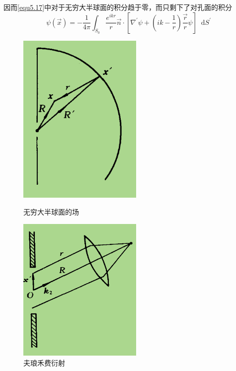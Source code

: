 \documentclass[UTF8]{ctexart}
\newcommand*{\dif}{\mathop{}\!\mathrm{d}}
\begin{document}
\noindent 因而\autoref{equ5.17}中对于无穷大半球面的积分趋于零，而只剩下了对孔面的积分
\begin{equation}
    \psi(\vec{x}) = - \frac{1}{4 \pi} \int_{S_0} \frac{e^{ikr}}{r} \vec{n} \cdot \left[\nabla^{\prime} \psi +\left(ik-\frac{1}{r}\right) \frac{\vec{r}}{r}\psi\right] \dif S^{\prime} \label{equ5.18}
\end{equation}

    \begin{figure}[htbp]
       \centering
       \begin{minipage}[t]{0.48 \textwidth}
           \centering
           \includegraphics[width=6cm]{figure5-5.png}
           \caption{无穷大半球面的场}
       \end{minipage}
       \begin{minipage}[t]{0.48 \textwidth}
           \centering
           \includegraphics[width=6cm]{figure5-6.png}
           \caption{夫琅禾费衍射}
       \end{minipage}
       \label{figure5.5-6}
       \end{figure}
\end{document}
